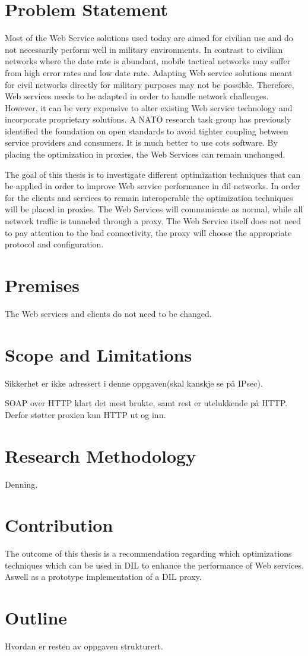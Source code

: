 \section{Problem Statement}
Most of the Web Service solutions used today are aimed for civilian use and do
not necessarily perform well in military environments. In contrast to civilian
networks where the date rate is abundant, mobile tactical networks may suffer
from high error rates and low date rate. Adapting Web service solutions meant
for civil networks directly for military purposes may not be possible.
Therefore, Web services needs to be adapted in order to handle network
challenges. However, it can be very expensive to alter existing Web service
technology and incorporate proprietary solutions. A NATO research task group has
previously identified the foundation on open standards to avoid tighter coupling
between service providers and consumers\cite{ist-090}. It is much better to use
\gls{cots} software. By placing the optimization in proxies, the
Web Services can remain unchanged.

The goal of this thesis is to investigate different optimization techniques that
can be applied in order to improve Web service performance in \gls{dil}
networks. In order for the clients and services to remain interoperable the
optimization techniques will be placed in proxies. The Web Services will
communicate as normal, while all network traffic is tunneled through a proxy.
The Web Service itself does not need to pay attention to the bad connectivity,
the proxy will choose the appropriate protocol and configuration.

\section{Premises}
The Web services and clients do not need to be changed.

\section{Scope and Limitations}
Sikkerhet er ikke adressert i denne oppgaven(skal kanskje se på IPsec).

SOAP over HTTP klart det mest brukte, samt rest er utelukkende på HTTP. Derfor
støtter proxien kun HTTP ut og inn.

\section{Research Methodology}
Denning.


\section{Contribution}

The outcome of this thesis is a recommendation regarding which optimizations
techniques which can be used in DIL to enhance the performance of Web services.
Aswell as a prototype implementation of a DIL proxy.

\section{Outline}
Hvordan er resten av oppgaven strukturert.
